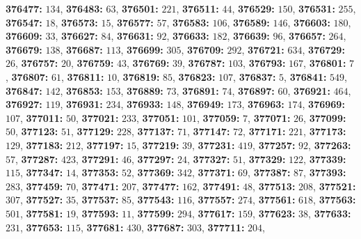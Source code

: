 \textsf{\bfseries 376477:} $134$, \textsf{\bfseries 376483:} $63$, \textsf{\bfseries 376501:} $221$, \textsf{\bfseries 376511:} $44$, \textsf{\bfseries 376529:} $150$, \textsf{\bfseries 376531:} $255$, \textsf{\bfseries 376547:} $18$, \textsf{\bfseries 376573:} $15$, \textsf{\bfseries 376577:} $57$, \textsf{\bfseries 376583:} $106$, \textsf{\bfseries 376589:} $146$, \textsf{\bfseries 376603:} $180$, \textsf{\bfseries 376609:} $33$, \textsf{\bfseries 376627:} $84$, \textsf{\bfseries 376631:} $92$, \textsf{\bfseries 376633:} $182$, \textsf{\bfseries 376639:} $96$, \textsf{\bfseries 376657:} $264$, \textsf{\bfseries 376679:} $138$, \textsf{\bfseries 376687:} $113$, \textsf{\bfseries 376699:} $305$, \textsf{\bfseries 376709:} $292$, \textsf{\bfseries 376721:} $634$, \textsf{\bfseries 376729:} $26$, \textsf{\bfseries 376757:} $20$, \textsf{\bfseries 376759:} $43$, \textsf{\bfseries 376769:} $39$, \textsf{\bfseries 376787:} $103$, \textsf{\bfseries 376793:} $167$, \textsf{\bfseries 376801:} $7$, \textsf{\bfseries 376807:} $61$, \textsf{\bfseries 376811:} $10$, \textsf{\bfseries 376819:} $85$, \textsf{\bfseries 376823:} $107$, \textsf{\bfseries 376837:} $5$, \textsf{\bfseries 376841:} $549$, \textsf{\bfseries 376847:} $142$, \textsf{\bfseries 376853:} $153$, \textsf{\bfseries 376889:} $73$, \textsf{\bfseries 376891:} $74$, \textsf{\bfseries 376897:} $60$, \textsf{\bfseries 376921:} $464$, \textsf{\bfseries 376927:} $119$, \textsf{\bfseries 376931:} $234$, \textsf{\bfseries 376933:} $148$, \textsf{\bfseries 376949:} $173$, \textsf{\bfseries 376963:} $174$, \textsf{\bfseries 376969:} $107$, \textsf{\bfseries 377011:} $50$, \textsf{\bfseries 377021:} $233$, \textsf{\bfseries 377051:} $101$, \textsf{\bfseries 377059:} $7$, \textsf{\bfseries 377071:} $26$, \textsf{\bfseries 377099:} $50$, \textsf{\bfseries 377123:} $51$, \textsf{\bfseries 377129:} $228$, \textsf{\bfseries 377137:} $71$, \textsf{\bfseries 377147:} $72$, \textsf{\bfseries 377171:} $221$, \textsf{\bfseries 377173:} $129$, \textsf{\bfseries 377183:} $212$, \textsf{\bfseries 377197:} $15$, \textsf{\bfseries 377219:} $39$, \textsf{\bfseries 377231:} $419$, \textsf{\bfseries 377257:} $92$, \textsf{\bfseries 377263:} $57$, \textsf{\bfseries 377287:} $423$, \textsf{\bfseries 377291:} $46$, \textsf{\bfseries 377297:} $24$, \textsf{\bfseries 377327:} $51$, \textsf{\bfseries 377329:} $122$, \textsf{\bfseries 377339:} $115$, \textsf{\bfseries 377347:} $14$, \textsf{\bfseries 377353:} $52$, \textsf{\bfseries 377369:} $342$, \textsf{\bfseries 377371:} $69$, \textsf{\bfseries 377387:} $87$, \textsf{\bfseries 377393:} $283$, \textsf{\bfseries 377459:} $70$, \textsf{\bfseries 377471:} $207$, \textsf{\bfseries 377477:} $162$, \textsf{\bfseries 377491:} $48$, \textsf{\bfseries 377513:} $208$, \textsf{\bfseries 377521:} $307$, \textsf{\bfseries 377527:} $35$, \textsf{\bfseries 377537:} $85$, \textsf{\bfseries 377543:} $116$, \textsf{\bfseries 377557:} $274$, \textsf{\bfseries 377561:} $618$, \textsf{\bfseries 377563:} $501$, \textsf{\bfseries 377581:} $19$, \textsf{\bfseries 377593:} $11$, \textsf{\bfseries 377599:} $294$, \textsf{\bfseries 377617:} $159$, \textsf{\bfseries 377623:} $38$, \textsf{\bfseries 377633:} $231$, \textsf{\bfseries 377653:} $115$, \textsf{\bfseries 377681:} $430$, \textsf{\bfseries 377687:} $303$, \textsf{\bfseries 377711:} $204$, 
